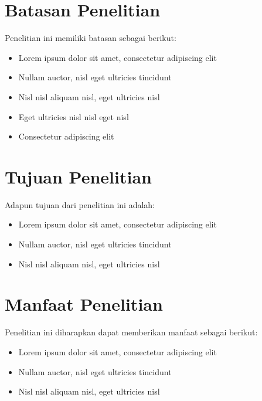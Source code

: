 \section{Batasan Penelitian}
Penelitian ini memiliki batasan sebagai berikut:
\begin{itemize}
    \item Lorem ipsum dolor sit amet, consectetur adipiscing elit
    \item Nullam auctor, nisl eget ultricies tincidunt
    \item Nisl nisl aliquam nisl, eget ultricies nisl
    \item Eget ultricies nisl nisl eget nisl
    \item Consectetur adipiscing elit
\end{itemize}

\section{Tujuan Penelitian}
Adapun tujuan dari penelitian ini adalah:
\begin{itemize}
    \item Lorem ipsum dolor sit amet, consectetur adipiscing elit
    \item Nullam auctor, nisl eget ultricies tincidunt
    \item Nisl nisl aliquam nisl, eget ultricies nisl
\end{itemize}

\section{Manfaat Penelitian}
Penelitian ini diharapkan dapat memberikan manfaat sebagai berikut:
\begin{itemize}
    \item Lorem ipsum dolor sit amet, consectetur adipiscing elit
    \item Nullam auctor, nisl eget ultricies tincidunt
    \item Nisl nisl aliquam nisl, eget ultricies nisl
\end{itemize}